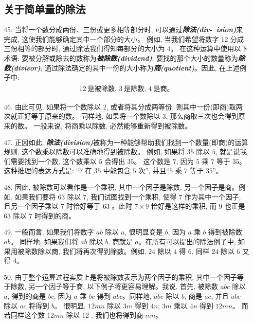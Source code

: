 \subsection{关于简单量的除法}
\par
45. 当将一个数分成两份、三份或更多相等部分时, 
可以通过\textbf{\textit{除法(div-~ision)}}来完成, 
这使我们能够确定其中一个部分的大小。
例如, 当我们希望将数字 $12$ 分成三份相等的部分时, 通过除法我们得知每部分的大小为 $4$。
在这种运算中使用以下术语: 要被分解或除去的数称为\textbf{\textit{被除数(dividend)}}; 
要找的那个大小的数量称为\textbf{\textit{除数(divisor)}}; 
通过除法确定的其中一份的大小称为\textbf{\textit{商(quotient)}}。因此, 在上述例子中: 
\begin{gather*}
	\begin{aligned}
12 \ \text{是被除数, }  
3 \ \text{是除数, } 
4 \ \text{是商。}
	\end{aligned}
\end{gather*}

46. 由此可见, 如果将一个数除以 $2$, 
或者将其分成两等份, 则其中一份(即商)取两次就正好等于原来的数。
同样地, 如果将一个数除以 $3$, 那么商取三次也会得到原来的数。
一般来说, 将商乘以除数, 必然能够重新得到被除数。

47. 正因如此, \textbf{\textit{除法(division)}}被称为一种能够帮助我们找到一个数量(即商)的运算规则, 
这个数乘以除数可以准确地得到被除数。
例如, 如果将 $35$ 除以 $5$, 就是说我们需要找到一个数, 这个数乘以 $5$ 会得出 $35$。
这个数是 $7$, 因为 $5$ 乘 $7$ 等于 $35$。这种推理的表达方式是: “$7$ 在 $35$ 中能包含 $5$ 次”, 并且“$5$ 乘 $7$ 等于 $35$”。

48. 因此, 被除数可以看作是一个乘积, 其中一个因子是除数, 
另一个因子是商。例如, 如果我们要将 $63$ 除以 $7$, 我们试图找到一个乘积, 
使得 $7$ 作为其中一个因子, 且另一个因子乘以 $7$ 时恰好等于 $63$ 。此时 $7\times9$ 恰好是这样的乘积, 
而 $9$ 也正是 $63$ 除以 $7$ 时得到的商。

49. 一般而言, 如果我们将数字 $ab$ 除以 $a$, 很明显商是 $b$, 因为 $a$ 乘 $b$ 得到被除数 $ab$。
同样地, 如果我们将 $ab$ 除以 $b$, 商就是 $a$。在所有可以提出的除法例子中, 如果用被除数除以商, 
我们将再次得到除数。例如, $24$ 除以 $4$ 得 $6$, 同样 $24$ 除以 $6$ 又得 $4$。

50. 由于整个运算过程实质上是将被除数表示为两个因子的乘积, 其中一个因子等于除数, 
另一个因子等于商, 以下例子将更容易理解。我说, 首先, 
被除数 $abc$ 除以 $a$, 得到的商是 $bc$, 因为 $a$ 乘 $bc$ 得到 $abc$。同样地, $abc$ 除以 $b$, 
商是 $ac$, 并且 $abc$ 除以 $ac$ 将得到 $b$。
很明显, $12mn$ 除以 $3m$ 得到 $4n$; $3m$ 乘以 $4n$ 得到 $12mn$。
而若同样这个数 $12mn$ 除以 $12$ , 我们也将得到商 $mn$。

